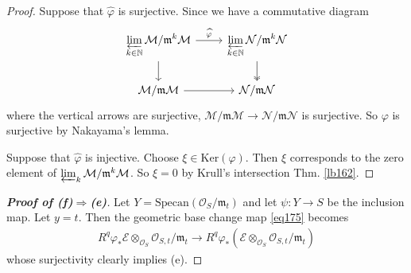 \documentclass[12pt,b5paper,notitlepage]{report}
\theoremstyle{definition}
\theoremstyle{plain}
\newcommand{\mc}{\mathcal}
\newcommand{\wht}{\widehat}
\newcommand{\scr}{\mathscr}
\newcommand{\Nbb}{\mathbb N}
\newcommand{\Ker}{\mathrm{Ker}}
\newcommand{\Specan}{\mathrm{Specan}}
\newcommand{\mk}{\mathfrak m}
\numberwithin{equation}{section}
\begin{document}
\begin{proof}
Suppose that $\wht\varphi$ is surjective. Since we have a commutative diagram
\begin{equation*}
\begin{tikzcd}
\displaystyle\varprojlim_{k\in\Nbb} \mc M/\mk^k\mc M\arrow[r,"\wht\varphi"] \arrow[d] & \displaystyle\varprojlim_{k\in\Nbb} \mc N/\mk^k\mc N \arrow[d, two heads] \\
\mc M/\mk\mc M \arrow[r]           &  \mc N/\mk\mc N         
\end{tikzcd}
\end{equation*}
where the vertical arrows are surjective, $\mc M/\mk\mc M\rightarrow\mc N/\mk\mc N$ is surjective. So $\varphi$ is surjective by Nakayama's lemma.

Suppose that $\wht\varphi$ is injective. Choose $\xi\in\Ker(\varphi)$. Then $\xi$ corresponds to the zero element of $\varprojlim_k \mc M/\mk^k\mc M$. So $\xi=0$ by Krull's intersection Thm. \ref{lb162}.
\end{proof}




\begin{proof}[\textbf{Proof of (f)$\Rightarrow$(e)}]
Let $Y=\Specan(\scr O_S/\mk_t)$ and let $\psi:Y\rightarrow S$ be the inclusion map. Let $y=t$. Then the geometric base change map \eqref{eq175} becomes
\begin{align*}
R^q\varphi_*\scr E\otimes_{\scr O_S}\scr O_{S,t}/\mk_t\rightarrow R^q\varphi_*(\scr E\otimes_{\scr O_S}\scr O_{S,t}/\mk_t)
\end{align*}
whose surjectivity clearly implies (e).
\end{proof}
\end{document}
